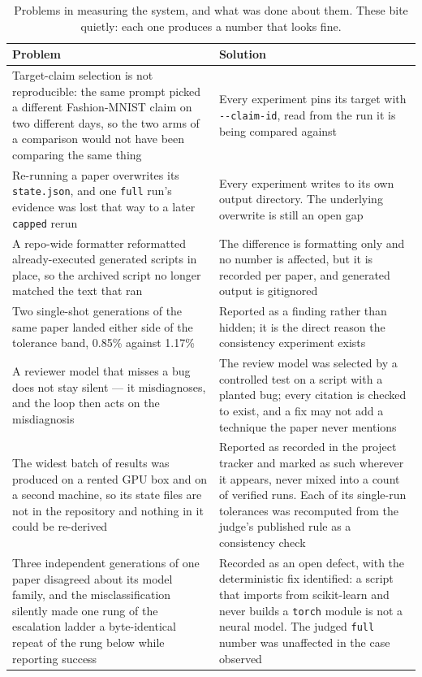 \documentclass[11pt]{article}
\newcommand{\squeeze}{\setlength{\tabcolsep}{4pt}}
\begin{document}
\begin{table}[tbp]
\centering
\small
\caption{Problems in measuring the system, and what was done about them. These bite quietly: each
one produces a number that looks fine.}
\label{tab:measurement}
\squeeze
\begin{tabular}{L{0.47\textwidth}L{0.47\textwidth}}
\toprule
Problem & Solution \\
\midrule
Target-claim selection is not reproducible: the same prompt picked a different Fashion-MNIST
  claim on two different days, so the two arms of a comparison would not have been comparing the
  same thing & Every experiment pins its target with \texttt{-{}-claim-id}, read from the run it is
  being compared against \\
Re-running a paper overwrites its \texttt{state.json}, and one \texttt{full} run's evidence was
  lost that way to a later \texttt{capped} rerun & Every experiment writes to its own output
  directory. The underlying overwrite is still an open gap \\
A repo-wide formatter reformatted already-executed generated scripts in place, so the archived
  script no longer matched the text that ran & The difference is formatting only and no number is
  affected, but it is recorded per paper, and generated output is gitignored \\
Two single-shot generations of the same paper landed either side of the tolerance band, 0.85\%
  against 1.17\% & Reported as a finding rather than hidden; it is the direct reason the
  consistency experiment exists \\
A reviewer model that misses a bug does not stay silent --- it misdiagnoses, and the loop then
  acts on the misdiagnosis & The review model was selected by a controlled test on a script with a
  planted bug; every citation is checked to exist, and a fix may not add a technique the paper
  never mentions \\
The widest batch of results was produced on a rented GPU box and on a second machine, so its
  state files are not in the repository and nothing in it could be re-derived & Reported as
  recorded in the project tracker and marked as such wherever it appears, never mixed into a
  count of verified runs. Each of its single-run tolerances was recomputed from the judge's
  published rule as a consistency check \\
Three independent generations of one paper disagreed about its model family, and the
  misclassification silently made one rung of the escalation ladder a byte-identical repeat of the
  rung below while reporting success & Recorded as an open defect, with the deterministic fix
  identified: a script that imports from scikit-learn and never builds a \texttt{torch} module is
  not a neural model. The judged \texttt{full} number was unaffected in the case observed \\
\bottomrule
\end{tabular}
\end{table}
\end{document}
